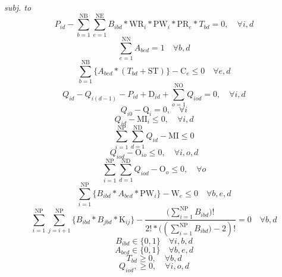 \emph{subj. to}
\begin{equation}
	P_{id} - \sum_{b=1}^{\mathrm{NB}}{\sum_{e=1}^{\mathrm{NE}}{B_{ibd}*\mathrm{WR}_i*\mathrm{PW}_i*\mathrm{PR}_e*T_{bd}}}  = 0, \quad \forall{i, d}
	\label{eq:prodQt}
\end{equation}
\begin{equation}
	\sum_{e=1}^{\mathrm{NN}}{A_{bed}} = 1 \quad \forall{b, d}
	\label{eq:batchRest}
\end{equation}
\begin{equation}
	\sum_{b=1}^{\mathrm{NB}}\{A_{bed}*(T_{bd}+\mathrm{ST})\} - \mathrm{C}_e \leq 0 \quad \forall{e, d}
	\label{eq:timeRest}
\end{equation}
\begin{equation}
	Q_{id} - Q_{i(d-1)} - P_{id} + \mathrm{D}_{id} + \sum_{o=1}^{\mathrm{NO}}{Q_{iod}} = 0 , \quad \forall{i, d}
	\label{eq:demSat}
\end{equation}
\begin{equation}
	Q_{i0} - \mathrm{Q}_i = 0, \quad \forall{i}
	\label{eq:demSatBC}
\end{equation}
\begin{equation}
	Q_{id} - \mathrm{MI}_i \leq 0, \quad \forall{i, d}
	\label{eq:invResByProd}
\end{equation}
\begin{equation}
	\sum_{i=1}^{\mathrm{NP}}{\sum_{d=1}^{\mathrm{ND}}{Q_{id}}} - \mathrm{MI} \leq 0
	\label{eq:invRes}
\end{equation}
\begin{equation}
	Q_{iod} - \mathrm{O}_{io} \leq 0, \quad \forall{i, o, d}
	\label{eq:outInvResByProd}
\end{equation}
\begin{equation}
	\sum_{i=1}^{\mathrm{NP}}{\sum_{d=1}^{\mathrm{ND}}{Q_{iod}}} - \mathrm{O}_o \leq 0, \quad \forall{o}
	\label{eq:outInvRes}
\end{equation}
\begin{equation}
	\sum_{i=1}^{\mathrm{NP}}\{B_{ibd}*A_{bed}*\mathrm{PW}_i\} - \mathrm{W}_e \leq 0 \quad \forall{b, e, d}
	\label{eq:widthCap}
\end{equation}
\begin{equation}
	\sum_{i=1}^{\mathrm{NP}}{\sum_{j=i+1}^{\mathrm{NP}}\{B_{ibd}*B_{jbd}*\mathrm{K}_{ij}\}} - \frac{(\sum_{i=1}^{\mathrm{NP}}{B_{ibd})}! }{2! * ((\sum_{i=1}^{\mathrm{NP}}{B_{ibd})} -2)!} = 0 \quad \forall{b, d}
	\label{eq:colourRest}
\end{equation}
\begin{equation}
	B_{ibd}  \in \{0,1\} \quad \forall{i, b, d}
	\label{eq:natVarBinB}
\end{equation}
\begin{equation}
	A_{bed}  \in \{0,1\} \quad \forall{b, e, d}
	\label{eq:natVarBinA}
\end{equation}
\begin{equation}
	T_{bd} \geq 0, \quad \forall{b, d}
	\label{eq:natVar}
\end{equation}
\begin{equation}
	Q_{iod},  \geq 0, \quad \forall{i, o, d}
	\label{eq:natVarO}
\end{equation}

